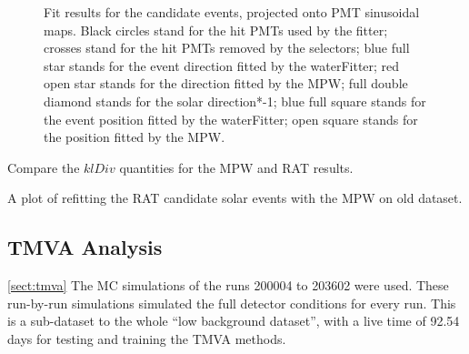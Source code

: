 \begin{figure}[htbp]
{\begin{minipage}[t]{0.4\textwidth}
		\end{minipage}
	}
	\caption{Fit results for the candidate events, projected onto PMT sinusoidal maps. Black circles stand for
		the hit PMTs used by the fitter; crosses stand for the hit PMTs removed by the selectors; blue full star stands for the event direction fitted by the waterFitter; red open star stands for the direction fitted by the MPW; full double diamond stands for the solar direction*-1; blue full square stands for the event position fitted by the waterFitter; open square stands for the position fitted by the MPW.}
	\label{openDataSetCandidate}
\end{figure}

Compare the $klDiv$ quantities for the MPW and RAT results. 

A plot of refitting the RAT candidate solar events with the MPW on old dataset.



\subsection{TMVA Analysis}\ref{sect:tmva}
The MC simulations of the runs 200004 to 203602 were used. These run-by-run simulations simulated the full detector conditions for every run. This is a sub-dataset to the whole ``low background dataset'', with a live time of 92.54 days for testing and training the TMVA methods.

